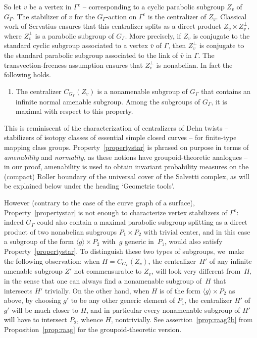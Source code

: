 So let $v$ be a vertex in $\Gamma^e$ -- corresponding to a cyclic parabolic subgroup $Z_v$ of~$G_\Gamma$. The stabilizer of $v$ for the $G_\Gamma$-action on $\Gamma^e$ is the centralizer of $Z_v$. Classical work of Servatius \cite{Ser} ensures that this centralizer splits as a direct product $Z_v\times Z_v^{\perp}$, where $Z_v^{\perp}$ is a parabolic subgroup of $G_\Gamma$. More precisely, if $Z_v$ is conjugate to the standard cyclic subgroup associated to a vertex $\bar v$ of $\Gamma$, then $Z_v^{\perp}$ is conjugate to the standard parabolic subgroup associated to the link of $\bar v$ in $\Gamma$. The transvection-freeness assumption ensures that $Z_v^{\perp}$ is nonabelian. In fact the following holds.
\begin{enumerate}\renewcommand{\theenumi}{$*$}
\item\label{propertystar}
The centralizer $C_{G_\Gamma}(Z_v)$ is a nonamenable subgroup of $G_\Gamma$ that contains an infinite normal amenable subgroup. Among the subgroups of $G_\Gamma$, it is maximal with respect to this property.
\end{enumerate}
This is reminiscent of the characterization of centralizers of Dehn twists -- \ie stabilizers of isotopy classes of essential simple closed curves -- for finite-type mapping class groups. Property~\eqref{propertystar} is phrased on purpose in terms of \emph{amenability} and \emph{normality}, as these notions have groupoid-theoretic analogues -- in our proof, amenability is used to obtain invariant probability measures on the (compact) Roller boundary of the universal cover of the Salvetti complex, as will be explained below under the heading `Geometric tools'.\enlargethispage{.5\baselineskip}%

However (contrary to the case of the curve graph of a surface), Property~\eqref{propertystar} is not enough to characterize vertex stabilizers of $\Gamma^e$: indeed $G_\Gamma$ could also contain a maximal parabolic subgroup splitting as a direct product of two nonabelian subgroups $P_1\times P_2$ with trivial center, and in this case a subgroup of the form $\langle g\rangle \times P_2$ with~$g$ generic in~$P_1$, would also satisfy Property~\eqref{propertystar}. To distinguish these two types of subgroups, we~make the following observation: when $H=C_{G_\Gamma}(Z_v)$, the centralizer~$H'$ of any infinite amenable subgroup $Z'$ not commensurable to $Z_v$, will look very different from~$H$, in the sense that one can always find a nonamenable subgroup of~$H$ that intersects $H'$ trivially. On the other hand, when $H$ is of the form $\langle g\rangle \times P_2$ as above, by choosing $g'$ to be any other generic element of $P_1$, the centralizer $H'$ of $g'$ will be much closer to $H$, and in particular every nonamenable subgroup of $H'$ will have to intersect $P_2$, whence $H$, nontrivially. See assertion~\eqref{prop:raag2b} from Proposition~\ref{prop:raag} for the groupoid-theoretic version.

